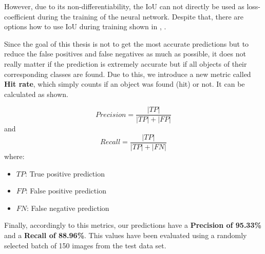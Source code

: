 However, due to its non-differentiability, the IoU can not directly be used as loss-coefficient during the training of the neural network. Despite that, there are options how to use IoU during training shown in \cite{Bebis.2016}, \cite{Yu.20160804}.

Since the goal of this thesis is not to get the most accurate predictions but to reduce the false positives and false negatives as much as possible, it does not really matter if the prediction is extremely accurate but if all objects of their corresponding classes are found. Due to this, we introduce a new metric called \textbf{Hit rate}, which simply counts if an object was found (hit) or not. It can be calculated as shown.

\begin{equation}
	Precision = \dfrac{|TP|}{|TP| + |FP|}
\end{equation}
and
\begin{equation}
	Recall = \dfrac{|TP|}{|TP| + |FN|}
\end{equation}
where:
\begin{itemize}[label=]
    \item $TP$: True positive prediction
    \item $FP$: False positive prediction
    \item $FN$: False negative prediction
\end{itemize}

Finally, accordingly to this metrics, our predictions have a \textbf{Precision of 95.33\%} and a \textbf{Recall of 88.96\%}. This values have been evaluated using a randomly selected batch of 150 images from the test data set.

